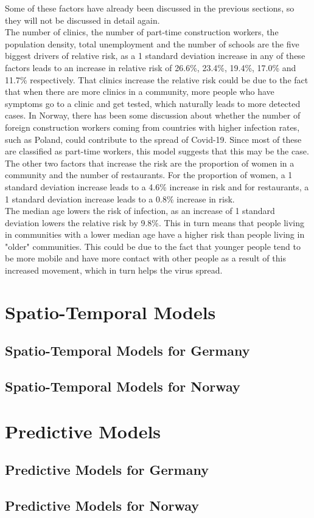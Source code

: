 Some of these factors have already been discussed in the previous sections, so they will not be discussed in detail again. \\
The number of clinics, the number of part-time construction workers, the population density, total unemployment and the number of schools are the five biggest drivers of relative risk, as a 1 standard deviation increase in any of these factors leads to an increase in relative risk of 26.6\%, 23.4\%, 19.4\%, 17.0\% and 11.7\% respectively. That clinics increase the relative risk could be due to the fact that when there are more clinics in a community, more people who have symptoms go to a clinic and get tested, which naturally leads to more detected cases. In Norway, there has been some discussion about whether the number of foreign construction workers coming from countries with higher infection rates, such as Poland, could contribute to the spread of Covid-19. Since most of these are classified as part-time workers, this model suggests that this may be the case. \\
The other two factors that increase the risk are the proportion of women in a community and the number of restaurants. For the proportion of women, a 1 standard deviation increase leads to a 4.6\% increase in risk and for restaurants, a 1 standard deviation increase leads to a 0.8\% increase in risk. \\
The median age lowers the risk of infection, as an increase of 1 standard deviation lowers the relative risk by 9.8\%. This in turn means that people living in communities with a lower median age have a higher risk than people living in "older" communities. This could be due to the fact that younger people tend to be more mobile and have more contact with other people as a result of this increased movement, which in turn helps the virus spread.
\clearpage
\section{Spatio-Temporal Models}
\subsection{Spatio-Temporal Models for Germany}
\subsection{Spatio-Temporal Models for Norway}
\section{Predictive Models}
\subsection{Predictive Models for Germany}
\subsection{Predictive Models for Norway}